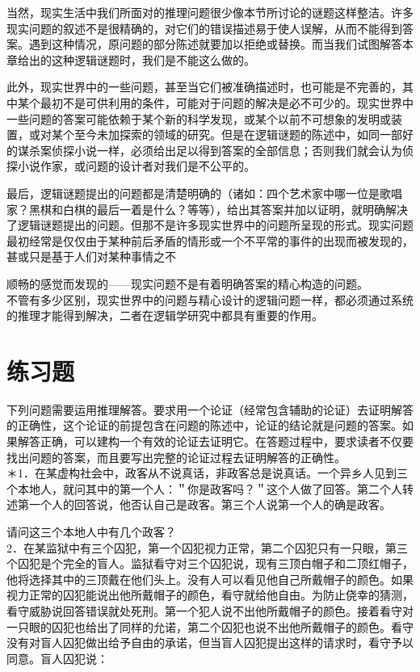 当然，现实生活中我们所面对的推理问题很少像本节所讨论的谜题这样整洁。许多现实问题的叙述不是很精确的，对它们的错误描述易于使人误解，从而不能得到答案。遇到这种情况，原问题的部分陈述就要加以拒绝或替换。而当我们试图解答本章给出的这种逻辑谜题时，我们是不能这么做的。

此外，现实世界中的一些问题，甚至当它们被准确描述时，也可能是不完善的，其中某个最初不是可供利用的条件，可能对于问题的解决是必不可少的。现实世界中一些问题的答案可能依赖于某个新的科学发现，或某个以前不可想象的发明或装置，或对某个至今未加探索的领域的研究。但是在逻辑谜题的陈述中，如同一部好的谋杀案侦探小说一样，必须给出足以得到答案的全部信息；否则我们就会认为侦探小说作家，或问题的设计者对我们是不公平的。

最后，逻辑谜题提出的问题都是清楚明确的（诸如：四个艺术家中哪一位是歌唱家？黑棋和白棋的最后一着是什么？等等），给出其答案并加以证明，就明确解决了逻辑谜题提出的问题。但那不是许多现实世界中的问题所呈现的形式。现实问题最初经常是仅仅由于某种前后矛盾的情形或一个不平常的事件的出现而被发现的，甚或只是基于人们对某种事情之不

顺畅的感觉而发现的——现实问题不是有着明确答案的精心构造的问题。\\
不管有多少区别，现实世界中的问题与精心设计的逻辑问题一样，都必须通过系统的推理才能得到解决，二者在逻辑学研究中都具有重要的作用。

\section*{练习题}
下列问题需要运用推理解答。要求用一个论证（经常包含辅助的论证）去证明解答的正确性，这个论证的前提包含在问题的陈述中，论证的结论就是问题的答案。如果解答正确，可以建构一个有效的论证去证明它。在答题过程中，要求读者不仅要找出问题的答案，而且要写出完整的论证过程去证明解答的正确性。\\
＊1．在某虚构社会中，政客从不说真话，非政客总是说真话。一个异乡人见到三个本地人，就问其中的第一个人：＂你是政客吗？＂这个人做了回答。第二个人转述第一个人的回答说，他否认自己是政客。第三个人说第一个人的确是政客。

请问这三个本地人中有几个政客？\\
2．在某监狱中有三个囚犯，第一个囚犯视力正常，第二个囚犯只有一只眼，第三个囚犯是个完全的盲人。监狱看守对三个囚犯说，现有三顶白帽子和二顶红帽子，他将选择其中的三顶戴在他们头上。没有人可以看见他自己所戴帽子的颜色。如果视力正常的囚犯能说出他所戴帽子的颜色，看守就给他自由。为防止侥幸的猜测，看守威胁说回答错误就处死刑。第一个犯人说不出他所戴帽子的颜色。接着看守对一只眼的囚犯也给出了同样的允诺，第二个囚犯也说不出他所戴帽子的颜色。看守没有对盲人囚犯做出给予自由的承诺，但当盲人囚犯提出这样的请求时，看守予以同意。盲人囚犯说：

